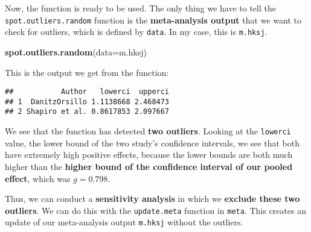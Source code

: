 \documentclass[]{book}
\newenvironment{Shaded}{\begin{snugshade}}{\end{snugshade}}
\newcommand{\KeywordTok}[1]{\textcolor[rgb]{0.13,0.29,0.53}{\textbf{#1}}}
\newcommand{\DataTypeTok}[1]{\textcolor[rgb]{0.13,0.29,0.53}{#1}}
\newcommand{\StringTok}[1]{\textcolor[rgb]{0.31,0.60,0.02}{#1}}
\newcommand{\ControlFlowTok}[1]{\textcolor[rgb]{0.13,0.29,0.53}{\textbf{#1}}}
\newcommand{\OperatorTok}[1]{\textcolor[rgb]{0.81,0.36,0.00}{\textbf{#1}}}
\newcommand{\NormalTok}[1]{#1}
\theoremstyle{definition}
\theoremstyle{definition}
\theoremstyle{definition}
\theoremstyle{remark}
\begin{document}
\begin{Shaded}
\end{Shaded}

Now, the function is ready to be used. The only thing we have to tell
the \texttt{spot.outliers.random} function is the \textbf{meta-analysis
output} that we want to check for outliers, which is defined by
\texttt{data}. In my case, this is \texttt{m.hksj}.

\begin{Shaded}
\begin{Highlighting}[]
\KeywordTok{spot.outliers.random}\NormalTok{(}\DataTypeTok{data=}\NormalTok{m.hksj)}
\end{Highlighting}
\end{Shaded}

This is the output we get from the function:

\begin{verbatim}
##           Author   lowerci  upperci
## 1  DanitzOrsillo 1.1138668 2.468473
## 2 Shapiro et al. 0.8617853 2.097667
\end{verbatim}

We see that the function has detected \textbf{two outliers}. Looking at
the \texttt{lowerci} value, the lower bound of the two study's
confidence intervals, we see that both have extremely high positive
effects, because the lower bounds are both much higher than the
\textbf{higher bound of the confidence interval of our pooled effect},
which was \(g = 0.798\).

Thus, we can conduct a \textbf{sensitivity analysis} in which we
\textbf{exclude these two outliers}. We can do this with the
\texttt{update.meta} function in \texttt{meta}. This creates an update
of our meta-analysis output \texttt{m.hksj} without the outliers.
\end{document}
